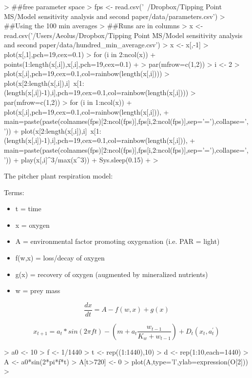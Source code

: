 \documentclass[12pt]{article}
\begin{document}
\begin{Schunk}
\begin{Sinput}
>   ##free parameter space
>   fps <- read.csv('~/Dropbox/Tipping Point MS/Model sensitivity analysis and second paper/data/parameters.csv') 
> ##Using the 100 min averages
> ##Runs are in columns
> x <- read.csv('/Users/Aeolus/Dropbox/Tipping Point MS/Model sensitivity analysis and second paper/data/hundred_min_average.csv')
> x <- x[,-1]
> plot(x[,1],pch=19,cex=0.1)
> for (i in 2:ncol(x)){
+   points(1:length(x[,i]),x[,i],pch=19,cex=0.1)
+ }
> par(mfrow=c(1,2))
> i <- 2
> plot(x[,i],pch=19,cex=0.1,col=rainbow(length(x[,i])))
> plot(x[2:length(x[,i]),i]~x[1:(length(x[,i])-1),i],pch=19,cex=0.1,col=rainbow(length(x[,i])))
> par(mfrow=c(1,2))
> for (i in 1:ncol(x)){
+   plot(x[,i],pch=19,cex=0.1,col=rainbow(length(x[,i])),
+        main=paste(paste(colnames(fps)[2:ncol(fps)],fps[i,2:ncol(fps)],sep='='),collapse=', '))
+   plot(x[2:length(x[,i]),i]~x[1:(length(x[,i])-1),i],pch=19,cex=0.1,col=rainbow(length(x[,i])),
+        main=paste(paste(colnames(fps)[2:ncol(fps)],fps[i,2:ncol(fps)],sep='='),collapse=', '))
+   play(x[,i]^3/max(x^3))
+   Sys.sleep(0.15)
+ }
> 
\end{Sinput}
\end{Schunk}

The pitcher plant respiration model:

Terms:

\begin{itemize}
\item t = time
\item x = oxygen
\item A = environmental factor promoting oxygenation (i.e. PAR = light)
\item f(w,x) = loss/decay of oxygen 
\item g(x) = recovery of oxygen (augmented by mineralized nutrients)
\item w = prey mass
\end{itemize}

\begin{equation}
  \frac{dx}{dt}  = A - f(w,x) + g(x)
\end{equation}

\begin{equation}
  x_{t+1} = a_t * sin(2 \pi f t) -  (m + a_t \frac{w_{t-1}}{K_w +
    w_{t-1}}) + D_t(x_t,a^{\prime}_t)
\end{equation}



\begin{Schunk}
\begin{Sinput}
>   a0 <- 10
> f <- 1/1440
> t <- rep((1:1440),10)
> d <- rep(1:10,each=1440)
> A <- a0*sin(2*pi*f*t)
> A[t>720] <- 0
> plot(A,type='l',ylab=expression(O[2]))
> 
\end{Sinput}
\end{Schunk}
\end{document}
